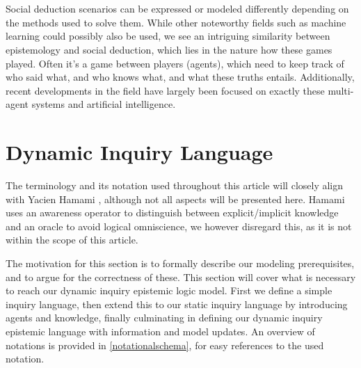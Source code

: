 \\\\

Social deduction scenarios can be expressed or modeled differently depending on the methods used to solve them. While other noteworthy fields such as machine learning could possibly also be used, we see an intriguing similarity between epistemology and social deduction, which lies in the nature how these games played. Often it's a game between players (agents), which need to keep track of who said what, and who knows what, and what these truths entails. Additionally, recent developments in the field have largely been focused on exactly these multi-agent systems and artificial intelligence. 

\section{Dynamic Inquiry Language}
The terminology and its notation used throughout this article will closely
align with Yacien Hamami \cite{delimi}, although not all aspects will be
presented here. Hamami uses an awareness operator to distinguish between explicit/implicit knowledge and an oracle to avoid logical omniscience, we however disregard this, as it is not within the scope of this article. 

The motivation for this section is to formally describe our
modeling prerequisites, and to argue for the correctness of these. This section will cover what is necessary to reach
our dynamic inquiry epistemic logic model. First we define a simple inquiry language, then extend this to our static inquiry language by introducing agents and knowledge, finally culminating in defining our dynamic inquiry epistemic language with information and model updates. An overview of notations is provided in \cref{notationalschema}, for easy references to the used notation. 

\newpage  

